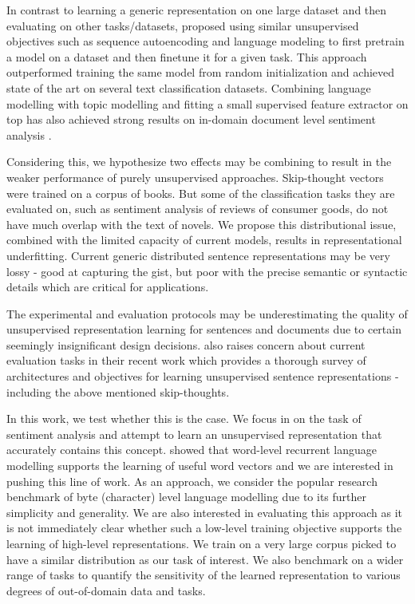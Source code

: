 \documentclass{article}
\begin{document}
In contrast to learning a generic representation on one large dataset and then evaluating on other tasks/datasets, \citet{dai2015semi} proposed using similar unsupervised objectives such as sequence autoencoding and language modeling to first pretrain a model on a dataset and then finetune it for a given task. This approach outperformed training the same model from random initialization and achieved state of the art on several text classification datasets. Combining language modelling with topic modelling and fitting a small supervised feature extractor on top has also achieved strong results on in-domain document level sentiment analysis \cite{dieng2016topicrnn}.

Considering this, we hypothesize two effects may be combining to result in the weaker performance of purely unsupervised approaches. Skip-thought vectors were trained on a corpus of books. But some of the classification tasks they are evaluated on, such as sentiment analysis of reviews of consumer goods, do not have much overlap with the text of novels. We propose this distributional issue, combined with the limited capacity of current models, results in representational underfitting. Current generic distributed sentence representations may be very lossy - good at capturing the gist, but poor with the precise semantic or syntactic details which are critical for applications.

The experimental and evaluation protocols may be underestimating the quality of unsupervised representation learning for sentences and documents due to certain seemingly insignificant design decisions. \citet{hill2016learning} also raises concern about current evaluation tasks in their recent work which provides a thorough survey of architectures and objectives for learning unsupervised sentence representations - including the above mentioned skip-thoughts.

In this work, we test whether this is the case. We focus in on the task of sentiment analysis and attempt to learn an unsupervised representation that accurately contains this concept. \citet{mikolov2013linguistic} showed that word-level recurrent language modelling supports the learning of useful word vectors and we are interested in pushing this line of work. As an approach, we consider the popular research benchmark of byte (character) level language modelling due to its further simplicity and generality. We are also interested in evaluating this approach as it is not immediately clear whether such a low-level training objective supports the learning of high-level representations. We train on a very large corpus picked to have a similar distribution as our task of interest. We also benchmark on a wider range of tasks to quantify the sensitivity of the learned representation to various degrees of out-of-domain data and tasks.
\end{document}
